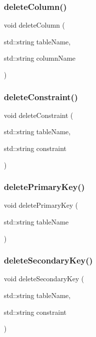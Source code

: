 \subsubsection{delete\+Column()}
{\footnotesize\ttfamily void delete\+Column (\begin{DoxyParamCaption}\item[{std\+::string}]{table\+Name,  }\item[{std\+::string}]{column\+Name }\end{DoxyParamCaption})}

\mbox{\label{tables_8cpp_ae62b61e29ea8b6010ae2463f80598460}} 
\subsubsection{delete\+Constraint()}
{\footnotesize\ttfamily void delete\+Constraint (\begin{DoxyParamCaption}\item[{std\+::string}]{table\+Name,  }\item[{std\+::string}]{constraint }\end{DoxyParamCaption})}

\mbox{\label{tables_8cpp_a36d0f9bb1b86a8155d7551fcd014b4da}} 
\subsubsection{delete\+Primary\+Key()}
{\footnotesize\ttfamily void delete\+Primary\+Key (\begin{DoxyParamCaption}\item[{std\+::string}]{table\+Name }\end{DoxyParamCaption})}

\mbox{\label{tables_8cpp_aee892818f06208ce4b68fb7598a7494c}} 
\subsubsection{delete\+Secondary\+Key()}
{\footnotesize\ttfamily void delete\+Secondary\+Key (\begin{DoxyParamCaption}\item[{std\+::string}]{table\+Name,  }\item[{std\+::string}]{constraint }\end{DoxyParamCaption})}

